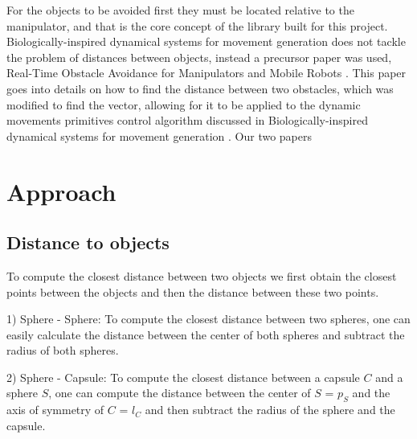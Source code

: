 \documentclass[a4paper, 10pt, conference]{ieeeconf}      %
\begin{document}

For the objects to be avoided first they must be located relative to the manipulator, and that is the core concept of the library built for this project. Biologically-inspired dynamical systems for movement generation \cite{Hoffmann} does not tackle the problem of distances between objects, instead a precursor paper was used, Real-Time Obstacle Avoidance for Manipulators and Mobile Robots \cite{Khatib}. This paper goes into details on how to find the distance between two obstacles, which was modified to find the vector, allowing for it to be applied to the dynamic movements primitives control algorithm discussed in Biologically-inspired dynamical systems for movement generation \cite{Hoffmann}.
Our two papers \cite{Hoffmann,Khatib}



\section{Approach}

\subsection{Distance to objects} %
To compute the closest distance between two objects we first obtain the closest points between the objects and then the distance between these two points.

1) Sphere - Sphere: 
To compute the closest distance between two spheres, one can easily calculate the distance between the center of both spheres and subtract the radius of both spheres.

2) Sphere - Capsule:
To compute the closest distance between a capsule $C$ and a sphere $S$, one can compute the distance between the center of $S$ = $p_S$ and the axis of symmetry of $C$ = $l_C$
and then subtract the radius of the sphere and the capsule. 
\end{document}
